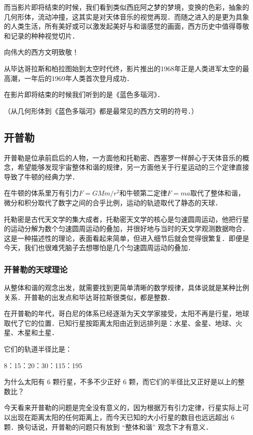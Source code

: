 而当影片即将结束的时候，我们看到类似西庇阿之梦的梦境，变换的色彩，抽象的几何形体，流动冲撞，这其实是对天体音乐的视觉再现．而随之进入的是更为具象的人类生活，所有美好或可以激发起美好与和谐感觉的画面，西方历史中值得尊敬和记录的种种视觉切片．

向伟大的西方文明致敬！

从毕达哥拉斯和柏拉图始到太空时代终，影片推出的1968年正是人类进军太空的最高潮，一年后的1969年人类首次登月成功．

在影片即将结束的时候我们听到的是《蓝色多瑙河》．

（从几何形体到《蓝色多瑙河》都是最常见的西方文明的符号．）


\subsection{开普勒}

开普勒是位承前启后的人物，一方面他和托勒密、西塞罗一样醉心于天体音乐的概念，希望能够发现宇宙整体和谐的规律，另一方面他关于行星运动的三个定律直接导致了牛顿的经典力学．

在牛顿的体系里万有引力$F = G M m /r^2$和牛顿第二定律$F = ma$取代了整体和谐，微分和积分取代了数字之间的合乎比例，运动的轨迹取代了静态的天球．

托勒密是古代天文学的集大成者，托勒密天文学的核心是匀速圆周运动，他把行星的运动分解为数个匀速圆周运动的叠加，并很好地与当时的天文学观测数据吻合．这是一种描述性的理论，表面看起来简单，但进入细节后就会觉得很繁复．即便是今天，我们也很难凭脑子去想哪怕是几个匀速圆周运动的叠加．

\subsubsection{开普勒的天球理论}

从整体和谐的观念出发，就需要找到更简单清晰的数学规律，具体说就是某种比例关系．开普勒的出发点和毕达哥拉斯很类似，都是整数．

在开普勒的年代，哥白尼的体系已经逐渐为天文学家接受，太阳不再是行星，地球取代了它的位置．已知行星按距离太阳由近到远排列是：水星、金星、地球、火星、木星和土星．

它们的轨道半径比是：

8：15：20：30：115：195

为什么太阳有 6 颗行星，不多不少正好 6 颗，而它们的半径比又正好是以上的整数比？

今天看来开普勒的问题是完全没有意义的，因为根据万有引力定律，行星实际上可以出现在距离太阳的任何距离上，而今天已知的大小行星的数目也远远超出 6 颗．换句话说，开普勒的问题只有放到 “整体和谐” 观念下才有意义．

